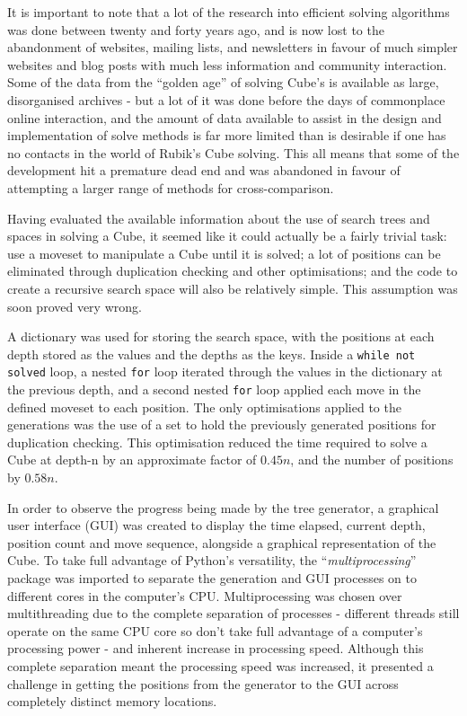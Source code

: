 \documentclass{report}
\newcommand{\tit}[1]{\textit{#1}}
\newcommand{\propernoun}[1]{\enquote{\tit{#1}}}
\newcommand{\depth}[1]{depth-#1}
\newenvironment{aside}
{\begin{mdframed}[style=0,%
		leftline=false,rightline=false,leftmargin=2em,rightmargin=2em,%
		innerleftmargin=0pt,innerrightmargin=0pt,linewidth=0.75pt,%
		skipabove=7pt,skipbelow=7pt]\small}
	{\end{mdframed}}
\begin{document}
   	\begin{aside}
   		    It is important to note that a lot of the research into efficient solving algorithms was done between twenty and forty years ago, and is now lost to the abandonment of websites, mailing lists, and newsletters in favour of much simpler websites and blog posts with much less information and community interaction. Some of the data from the \enquote{golden age} of solving Cube's is available as large, disorganised archives  - but a lot of it was done before the days of commonplace online interaction, and the amount of data available to assist in the design and implementation of solve methods is far more limited than is desirable if one has no contacts in the world of Rubik's Cube solving. This all means that some of the development hit a premature dead end and was abandoned in favour of attempting a larger range of methods for cross-comparison.
   	\end{aside}

    Having evaluated the available information about the use of search trees and spaces in solving a Cube, it seemed like it could actually be a fairly trivial task: use a moveset to manipulate a Cube until it is solved; a lot of positions can be eliminated through duplication checking and other optimisations; and the code to create a recursive search space will also be relatively simple. This assumption was soon proved very wrong.
    
    A dictionary was used for storing the search space, with the positions at each depth stored as the values and the depths as the keys. Inside a \lstinline|while not solved| loop, a nested \lstinline|for| loop iterated through the values in the dictionary at the previous depth, and a second nested \lstinline|for| loop applied each move in the defined moveset to each position. The only optimisations applied to the generations was the use of a set to hold the previously generated positions for duplication checking. This optimisation reduced the time required to solve a Cube at \depth{n} by an approximate factor of $0.45n$, and the number of positions by $0.58n$.
    
    In order to observe the progress being made by the tree generator, a graphical user interface (GUI) was created to display the time elapsed, current depth, position count and move sequence, alongside a graphical representation of the Cube. To take full advantage of Python's versatility, the \propernoun{multiprocessing} package was imported to separate the generation and GUI processes on to different cores in the computer's CPU. Multiprocessing was chosen over multithreading due to the complete separation of processes - different threads still operate on the same CPU core so don't take full advantage of a computer's processing power - and inherent increase in processing speed. Although this complete separation meant the processing speed was increased, it presented a challenge in getting the positions from the generator to the GUI across completely distinct memory locations.
    
\end{document}
